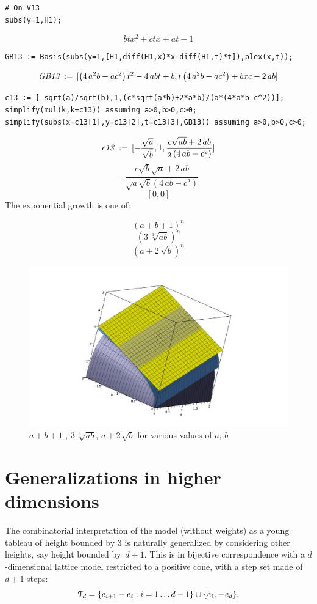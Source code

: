 \documentclass[11pt]{article}
\newcommand{\cT}{\EuScript{T}}
\begin{document}
\begin{verbatim}
# On V13
subs(y=1,H1);
\end{verbatim}

\[\displaystyle bt{x}^{2}+ctx+at-1\]

\begin{verbatim}
GB13 := Basis(subs(y=1,[H1,diff(H1,x)*x-diff(H1,t)*t]),plex(x,t));
\end{verbatim}

\[\displaystyle {\it GB13}\, := \,[ \left( 4\,{a}^{2}b-a{c}^{2} \right) {t}^{2}-4\,abt+b,t \left( 4\,{a}^{2}b-a{c}^{2} \right) +bxc-2\,ab]\]

\begin{verbatim}
c13 := [-sqrt(a)/sqrt(b),1,(c*sqrt(a*b)+2*a*b)/(a*(4*a*b-c^2))];
simplify(mul(k,k=c13)) assuming a>0,b>0,c>0;
simplify(subs(x=c13[1],y=c13[2],t=c13[3],GB13)) assuming a>0,b>0,c>0;
\end{verbatim}

\[\displaystyle {\it c13}\, :=
  \,[-{\frac { \sqrt{a}}{ \sqrt{b}}},1,{\frac {c \sqrt{ab}+2\,ab}{a
      \left( 4\,ab-{c}^{2} \right) }}]\]
\[\displaystyle
  -{\frac {c \sqrt{b} \sqrt{a}+2\,ab}{ \sqrt{a} \sqrt{b} \left(
        4\,ab-{c}^{2} \right) }}\]
\[\displaystyle [0,0]\]
The exponential growth is one of:

\[\displaystyle  \left( a+b+1 \right) ^{n}\]
\[\displaystyle  \left( 3\,\sqrt [3]{ab} \right) ^{n}\]
\[\displaystyle  \left( a+2\, \sqrt{b} \right) ^{n}\]

\begin{figure}\center
\includegraphics[width=.4\textwidth]{growthcurve.jpg}
\caption{$ a+b+1 $ , $3\,\sqrt[3]{ab} $, $a+2\, \sqrt{b}$ for
various values of $a$, $b$}
\end{figure}

\section{Generalizations in higher dimensions}
The combinatorial interpretation of the model (without weights) as a
young tableau of height bounded by 3 is naturally generalized by
considering other heights, say height bounded by~$d+1$. This is in
bijective correspondence with a $d$-dimensional lattice model
restricted to a positive cone, with a step set made of $d+1$ steps:
\[\cT_d=\{e_{i+1}-e_{i}: i=1 \dots d-1\}\cup\{e_1, -e_d\}.\]
\end{document}
